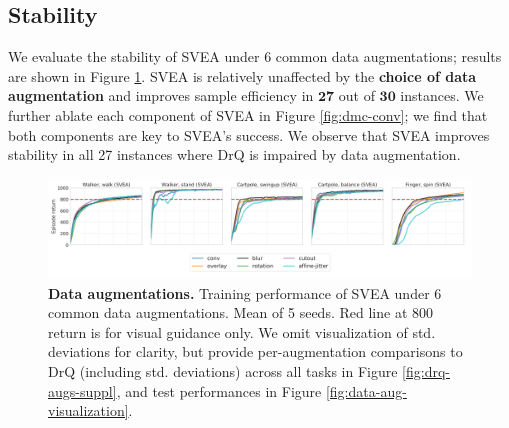\newpage
\subsection*{\textbf{Stability}}

We evaluate the stability of SVEA under 6 common data augmentations; results are shown in Figure \ref{fig:dmc-augs}. SVEA is relatively unaffected by the \textbf{choice of data augmentation} and improves sample efficiency in $\mathbf{27}$ out of $\mathbf{30}$ instances. We further ablate each component of SVEA in Figure \ref{fig:dmc-conv}; we find that both components are key to SVEA's success. We observe that SVEA improves stability in all 27 instances where DrQ is impaired by data augmentation. 
\begin{figure}[H]
    \includegraphics[width=\textwidth]{figures/drq_augs.png}
    \vspace{-0.2in}
    \caption{\textbf{Data augmentations.} Training performance of SVEA under 6 common data augmentations. Mean of 5 seeds. Red line at $800$ return is for visual guidance only. We omit visualization of std. deviations for clarity, but provide per-augmentation comparisons to DrQ (including std. deviations) across all tasks in Figure \ref{fig:drq-augs-suppl}, and test performances in Figure \ref{fig:data-aug-visualization}.}
    \label{fig:dmc-augs}
    \vspace{-0.125in}
\end{figure}
